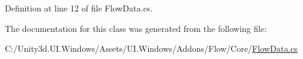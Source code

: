 Definition at line 12 of file Flow\+Data.\+cs.



The documentation for this class was generated from the following file\+:\begin{DoxyCompactItemize}
\item 
C\+:/\+Unity3d.\+U\+I.\+Windows/\+Assets/\+U\+I.\+Windows/\+Addons/\+Flow/\+Core/\hyperlink{_flow_data_8cs}{Flow\+Data.\+cs}\end{DoxyCompactItemize}
